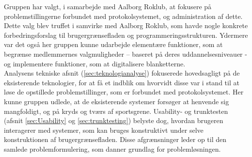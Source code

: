 Gruppen har valgt, i samarbejde med Aalborg Roklub, at fokusere på problemstillingerne forbundet med protokolsystemet, og administration af dette. Dette valg blev truffet i samvirke med Aalborg Roklub, som havde nogle konkrete forbedringsforslag til brugergrænsefladen og programmeringsstrukturen. Ydermere var det også her gruppen kunne udarbejde elementære funktioner, som at begrænse medlemmernes valgmuligheder – baseret på deres uddannelsesniveauer - og implementere funktioner, som at digitalisere blanketterne. \\
Analysens tekniske afsnit (\ref{sec:teknologianalyse}) fokuserede hovedsagligt på de eksisterende teknologier, for at få et indblik om hvorvidt disse var i stand til at løse de opstillede problemstillinger, som er forbundet med protokolsystemet. Her kunne gruppen udlede, at de eksisterende systemer forsøger at henvende sig mangfoldigt, og på kryds og tværs af sportsgrene. Usability- og trunktesten (afsnit \ref{sec:Usability} og \ref{sec:trunktesting}) belyste dog, hvordan brugeren interagerer med systemer, som kan bruges konstruktivt under selve konstruktionen af brugergrænsefladen. 
Disse afgrænsninger leder op til den samlede problemformulering, som danner grundlag for problemløsningen.\\






